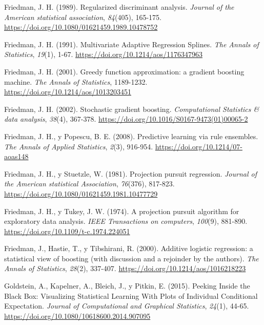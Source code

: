 \documentclass[
]{book}
\newlength{\cslhangindent}
\newlength{\cslentryspacingunit} %
\newenvironment{CSLReferences}[2] %
 {%
  \setlength{\parindent}{0pt}
  \ifodd #1
  \let\oldpar\par
  \def\par{\hangindent=\cslhangindent\oldpar}
  \fi
  \setlength{\parskip}{#2\cslentryspacingunit}
 }%
 {}
\theoremstyle{break}
\theoremstyle{nonumberplain}
\begin{document}
\begin{CSLReferences}{1}{0}
\leavevmode{}%
Friedman, J. H. (1989). Regularized discriminant analysis. \emph{Journal of the American statistical association}, \emph{84}(405), 165-175. \url{https://doi.org/10.1080/01621459.1989.10478752}

\leavevmode{}%
Friedman, J. H. (1991). {Multivariate Adaptive Regression Splines}. \emph{The Annals of Statistics}, \emph{19}(1), 1-67. \url{https://doi.org/10.1214/aos/1176347963}

\leavevmode{}%
Friedman, J. H. (2001). Greedy function approximation: a gradient boosting machine. \emph{The Annals of Statistics}, 1189-1232. \url{https://doi.org/10.1214/aos/1013203451}

\leavevmode{}%
Friedman, J. H. (2002). Stochastic gradient boosting. \emph{Computational Statistics \& data analysis}, \emph{38}(4), 367-378. \url{https://doi.org/10.1016/S0167-9473(01)00065-2}

\leavevmode{}%
Friedman, J. H., y Popescu, B. E. (2008). Predictive learning via rule ensembles. \emph{The Annals of Applied Statistics}, \emph{2}(3), 916-954. \url{https://doi.org/10.1214/07-aoas148}

\leavevmode{}%
Friedman, J. H., y Stuetzle, W. (1981). Projection pursuit regression. \emph{Journal of the American statistical Association}, \emph{76}(376), 817-823. \url{https://doi.org/10.1080/01621459.1981.10477729}

\leavevmode{}%
Friedman, J. H., y Tukey, J. W. (1974). A projection pursuit algorithm for exploratory data analysis. \emph{IEEE Transactions on computers}, \emph{100}(9), 881-890. \url{https://doi.org/10.1109/t-c.1974.224051}

\leavevmode{}%
Friedman, J., Hastie, T., y Tibshirani, R. (2000). Additive logistic regression: a statistical view of boosting (with discussion and a rejoinder by the authors). \emph{The Annals of Statistics}, \emph{28}(2), 337-407. \url{https://doi.org/10.1214/aos/1016218223}

\leavevmode{}%
Goldstein, A., Kapelner, A., Bleich, J., y Pitkin, E. (2015). Peeking Inside the Black Box: Visualizing Statistical Learning With Plots of Individual Conditional Expectation. \emph{Journal of Computational and Graphical Statistics}, \emph{24}(1), 44-65. \url{https://doi.org/10.1080/10618600.2014.907095}


\end{CSLReferences}
\end{document}
